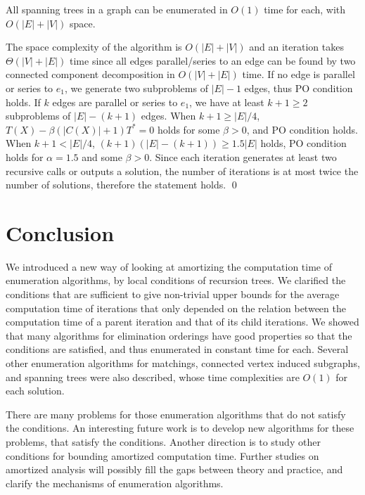 \documentclass{llncs}
\begin{document}
\begin{theorem}\label{spantree}
All spanning trees in a graph can be enumerated in $O(1)$ time
 for each, with $O(|E|+|V|)$ space.
\end{theorem}

\proof
The space complexity of the algorithm is $O(|E|+|V|)$ and an 
iteration takes $\Theta(|V|+|E|)$ time since all edges parallel/series to
 an edge can be found by two connected
 component decomposition in $O(|V|+|E|)$ time.
If no edge is parallel or series to $e_1$,
 we generate two subproblems of $|E|-1$ edges, thus PO condition holds.
If $k$ edges are parallel or series to $e_1$, we have at least $k+1\ge 2$
 subproblems of $|E|-(k+1)$ edges.
When $k+1\ge |E|/4$, $T(X) - \beta (|C(X)|+1)T^* = 0 $ holds for some 
 $\beta>0$, and PO condition holds.
When $k+1< |E|/4$, $(k+1)(|E|-(k+1)) \ge 1.5|E|$ holds, 
 PO condition holds for $\alpha = 1.5$ and some $\beta>0$.
Since each iteration generates at least two recursive calls or outputs a
 solution, the number of iterations is at most twice the number of solutions,
 therefore the statement holds.
\qed



\vspace{-2mm}
\section{Conclusion}\label{sec:cncl}
\vspace{-2mm}

We introduced a new way of looking at amortizing the computation time of 
 enumeration algorithms, by local conditions of recursion trees.
We clarified the conditions that are sufficient to give non-trivial upper 
 bounds for the average computation time of iterations that only depended
 on the relation between the computation time of a parent iteration and
  that of its child iterations.
We showed that many algorithms for elimination orderings have good
 properties so that the conditions are satisfied, and thus enumerated 
 in constant time for each.
Several other enumeration algorithms for matchings, connected vertex
 induced subgraphs, and spanning trees were also described, whose
 time complexities are $O(1)$ for each solution.

There are many problems for those enumeration algorithms that do not
 satisfy the conditions.
An interesting future work is to develop new algorithms for these
 problems, that satisfy the conditions.
Another direction is to study other conditions for bounding 
 amortized computation time.
Further studies on amortized analysis will possibly fill the gaps between 
 theory and practice, and clarify the mechanisms of enumeration algorithms.
 
\end{document}
